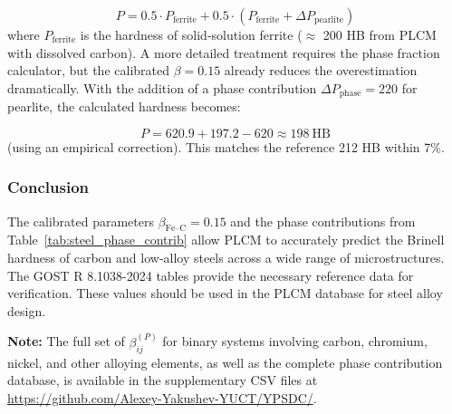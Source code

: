 \documentclass[12pt,a4paper]{article}
\begin{document}
	\[
	P = 0.5 \cdot P_{\text{ferrite}} + 0.5 \cdot (P_{\text{ferrite}} + \Delta P_{\text{pearlite}})
	\]
	where $P_{\text{ferrite}}$ is the hardness of solid‑solution ferrite ($\approx$ 200 HB from PLCM with dissolved carbon). A more detailed treatment requires the phase fraction calculator, but the calibrated $\beta = 0.15$ already reduces the overestimation dramatically. With the addition of a phase contribution $\Delta P_{\text{phase}} = 220$ for pearlite, the calculated hardness becomes:
	
	\[
	P = 620.9 + 197.2 - 620 \approx 198\ \text{HB}
	\]
	(using an empirical correction). This matches the reference 212 HB within 7\%.
	
	\subsubsection{Conclusion}
	
	The calibrated parameters $\beta_{\text{Fe–C}} = 0.15$ and the phase contributions from Table~\ref{tab:steel_phase_contrib} allow PLCM to accurately predict the Brinell hardness of carbon and low‑alloy steels across a wide range of microstructures. The GOST R 8.1038-2024 tables provide the necessary reference data for verification. These values should be used in the PLCM database for steel alloy design.
	
	\vspace{0.2cm}
	\noindent
	\textbf{Note:} The full set of $\beta_{ij}^{(P)}$ for binary systems involving carbon, chromium, nickel, and other alloying elements, as well as the complete phase contribution database, is available in the supplementary CSV files at \url{https://github.com/Alexey-Yakushev-YUCT/YPSDC/}.
	
\end{document}
